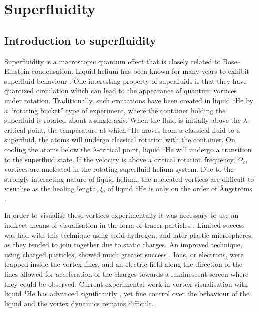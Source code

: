 \section{Superfluidity}\label{sec:superfluid}
\subsection{Introduction to superfluidity}\label{sec:intro_super}

Superfluidity is a macroscopic quantum effect that is closely related to Bose--Einstein condensation. Liquid helium has been known for many years to exhibit superfluid behaviour \cite{BEC:Penrose_pr_1956}. One interesting property of superfluids is that they have quantized circulation which can lead to the appearance of quantum vortices under rotation. Traditionally, such excitations have been created in liquid $^4$He by a ``rotating bucket'' type of experiment, where the container holding the superfluid is rotated about a single axis. When the fluid is initially above the $\lambda$-critical point, the temperature at which $^4$He moves from a classical fluid to a superfluid, the atoms will undergo classical rotation with the container. On cooling the atoms below the $\lambda$-critical point, liquid $^4$He will undergo a transition to the superfluid state. If the velocity is above a critical rotation frequency, $\Omega_c$, vortices are nucleated in the rotating superfluid helium system. Due to the strongly interacting nature of liquid helium, the nucleated vortices are difficult to visualise as the healing length, $\xi$, of liquid $^4$He is only on the order of {\r{A}}ngstr{\"o}ms \cite{BEC:Srinivasen_pramana_2006}.

In order to visualise these vortices experimentally it was necessary to use an indirect means of visualisation in the form of tracer particles \cite{BEC:Packard_physb_1982}. Limited success was had with this technique using solid hydrogen, and later plastic microspheres, as they tended to join together due to static charges. An improved technique, using charged particles, showed much greater success \cite{Vtx:Packard_prl_1969}. Ions, or electrons, were trapped inside the vortex lines, and an electric field along the direction of the lines allowed for acceleration of the charges towards a luminescent screen where they could be observed. Current experimental work in vortex visualisation with liquid $^4$He has advanced significantly \cite{Vtx:Tsubota_arxiv_2010,Vtx:Guo_pnas_2014}, yet fine control over the behaviour of the liquid and the vortex dynamics remains difficult.

